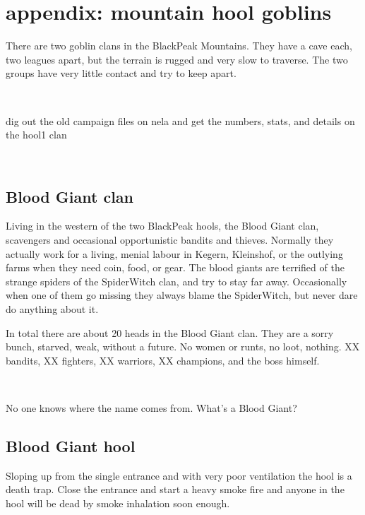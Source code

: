 \clearpage
\raggedbottom
\section*{appendix: mountain hool goblins}
\label{appendixmountaingoblins}

There are two goblin clans in the BlackPeak Mountains. They have a cave each, two leagues apart, but the terrain is rugged and very slow to traverse. The two groups have very little contact and try to keep apart.

\

\todo dig out the old campaign files on nela and get the numbers, stats, and details on the hool1 clan

\


\subsection*{Blood Giant clan}

Living in the western of the two BlackPeak hools, the Blood Giant clan, scavengers and occasional opportunistic bandits and thieves. Normally they actually work for a living, menial labour in Kegern, Kleinshof, or the outlying farms when they need coin, food, or gear. The blood giants are terrified of the strange spiders of the SpiderWitch clan, and try to stay far away. Occasionally when one of them go missing they always blame the SpiderWitch, but never dare do anything about it.

In total there are about 20 heads in the Blood Giant clan. They are a sorry bunch, starved, weak, without a future. No women or runts, no loot, nothing.
XX bandits, 
XX fighters, 
XX warriors, 
XX champions, 
and the boss himself.

\

\noindent No one knows where the name comes from. What's a Blood Giant?


\subsection*{Blood Giant hool}

Sloping up from the single entrance and with very poor ventilation the hool is a death trap. Close the entrance and start a heavy smoke fire and anyone in the hool will be dead by smoke inhalation soon enough.

